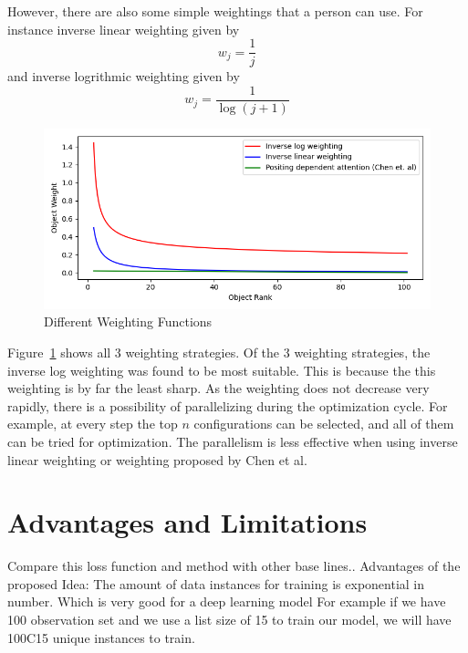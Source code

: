 \documentclass[11pt]{report}
\begin{document}
However, there are also some simple weightings that a person can use.  For instance inverse linear weighting given by
\begin{equation}
w_j = \frac{1}{j}
\end{equation}
and inverse logrithmic weighting given by
\begin{equation}
w_j = \frac{1}{\log (j+1)}
\end{equation}

\begin{figure}[htb]
  \centering
    \includegraphics[scale=0.65]{images/weightingfunctions}
    \caption{Different Weighting Functions}
    \label{fig:weightingfunctions}
\end{figure}

Figure~\ref{fig:weightingfunctions} shows all 3 weighting strategies.
Of the 3 weighting strategies,  the inverse log weighting was found to be most suitable.
This is because the this weighting is by far the least sharp.
As the weighting does not decrease very rapidly,  there is a possibility of parallelizing during the optimization cycle.
For example,  at every step the top $n$ configurations can be selected,  and all of them can be tried for optimization.
The parallelism is less effective when using inverse linear weighting or weighting proposed by Chen et al.



\section{Advantages and Limitations}

Compare this loss function and method with other base lines..
Advantages of the proposed Idea:
    The amount of data instances for training is exponential in number. Which is very good for a deep learning model
    For example if we have 100 observation set and we use a list size of 15 to train our model, we will have 100C15
    unique instances to train.
\end{document}
